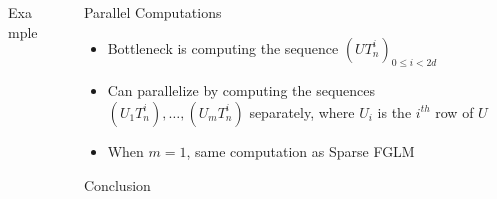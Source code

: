 \documentclass[final]{beamer}
\newlength{\sepwid}
\newlength{\onecolwid}
\newlength{\twocolwid}
\begin{document}
\begin{frame}[t]
\begin{columns}[t]
\begin{column}{\twocolwid}
\begin{alertblock}{{\sf Example}}
        \end{alertblock}


\end{column} %

\begin{column}{\sepwid}\end{column} %

\begin{column}{\onecolwid} %

\begin{alertblock}{Parallel Computations}
	\begin{itemize}
		\item Bottleneck is computing the sequence $(UT_n^i)_{0 \le i < 2d}$
		\item Can parallelize by computing the sequences $(U_1T_n^i),\dots,(U_mT_n^i)$
		separately, where $U_i$ is the $i^{th}$ row of $U$
		\item When $m=1$, same computation as Sparse FGLM
	\end{itemize}
\end{alertblock}


\begin{block}{Conclusion}

\end{block}






\end{column}
\end{columns}
\end{frame}
\end{document}
